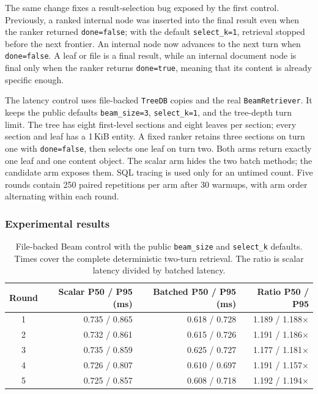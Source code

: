 \documentclass[10pt]{article}
\newcommand{\code}[1]{\texttt{#1}}
\newcommand{\hdr}{\rowcolor{hdrgray}}
\newenvironment{ctab}{\par\smallskip\centering\small
  \setlength{\tabcolsep}{5pt}\renewcommand{\arraystretch}{1.12}}{\par\smallskip}
\begin{document}
The same change fixes a result-selection bug exposed by the first control.
Previously, a ranked internal node was inserted into the final result even
when the ranker returned \code{done=false}; with the default
\code{select\_k=1}, retrieval stopped before the next frontier. An internal
node now advances to the next turn when \code{done=false}. A leaf or file is a
final result, while an internal document node is final only when the ranker
returns \code{done=true}, meaning that its content is already specific enough.

The latency control uses file-backed \code{TreeDB} copies and the real
\code{BeamRetriever}. It keeps the public defaults
\code{beam\_size=3}, \code{select\_k=1}, and the tree-depth turn limit.
The tree has eight first-level sections and eight leaves per section; every
section and leaf has a 1\,KiB entity. A fixed ranker retains three sections on
turn one with \code{done=false}, then selects one leaf on turn two. Both arms
return exactly one leaf and one content object. The scalar arm hides the two
batch methods; the candidate arm exposes them. SQL tracing is used only for an
untimed count. Five rounds contain 250 paired repetitions per arm after 30
warmups, with arm order alternating within each round.

\subsubsection{Experimental results}

\begin{table}[H]
\caption{File-backed Beam control with the public \code{beam\_size} and
\code{select\_k} defaults. Times cover the complete deterministic two-turn
retrieval. The ratio is scalar latency divided by batched latency.}
\label{tab:sqlite-beam-batching}
\begin{ctab}
\begin{tabular}{@{}crrr@{}}
\toprule
\hdr Round & Scalar P50 / P95 (ms) & Batched P50 / P95 (ms) & Ratio P50 / P95 \\
\midrule
1 & 0.735 / 0.865 & 0.618 / 0.728 & 1.189 / 1.188$\times$ \\
2 & 0.732 / 0.861 & 0.615 / 0.726 & 1.191 / 1.186$\times$ \\
3 & 0.735 / 0.859 & 0.625 / 0.727 & 1.177 / 1.181$\times$ \\
4 & 0.726 / 0.807 & 0.610 / 0.697 & 1.191 / 1.157$\times$ \\
5 & 0.725 / 0.857 & 0.608 / 0.718 & 1.192 / 1.194$\times$ \\
\bottomrule
\end{tabular}
\end{ctab}
\end{table}
\end{document}
